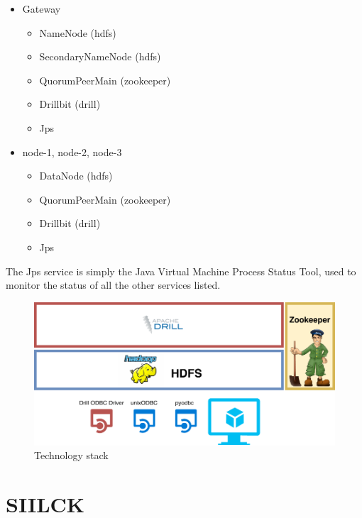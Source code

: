 \documentclass[a4paper,english]{report}
\begin{document}
			\begin{itemize}
				\item Gateway
				\begin{itemize}
					\item NameNode (hdfs)
					\item SecondaryNameNode (hdfs)
					\item QuorumPeerMain (zookeeper)
					\item Drillbit (drill)
					\item Jps
				\end{itemize}
				\item node-1, node-2, node-3
				\begin{itemize}
					\item DataNode (hdfs)
					\item QuorumPeerMain (zookeeper)
					\item Drillbit (drill)
					\item Jps
				\end{itemize}
			\end{itemize}
			The Jps service is simply the Java Virtual Machine Process Status Tool, used to monitor the status of all the other services listed.
			\begin{figure}[h]
				\includegraphics[width=\textwidth]{tech_stack}
				\caption{Technology stack}
			\end{figure}
		\clearpage
		\section{SIILCK}
		\label{sec:siilck}
\end{document}
